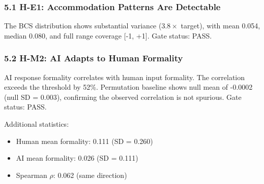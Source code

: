 
\subsubsection{5.1 H-E1: Accommodation Patterns Are Detectable}

\begin{table}[htbp]
\centering
{}
\end{table}

The BCS distribution shows substantial variance (3.$8\times$ target), with mean 0.054, median 0.080, and full range coverage [-1, +1]. Gate status: PASS.

\subsubsection{5.2 H-M2: AI Adapts to Human Formality}

\begin{table}[htbp]
\centering
{}
\end{table}

AI response formality correlates with human input formality. The correlation exceeds the threshold by 52\%. Permutation baseline shows null mean of -0.0002 (null SD = 0.003), confirming the observed correlation is not spurious. Gate status: PASS.

Additional statistics:
\begin{itemize}
\item Human mean formality: 0.111 (SD = 0.260)
\item AI mean formality: 0.026 (SD = 0.111)
\item Spearman $\rho$: 0.062 (same direction)
\end{itemize}

